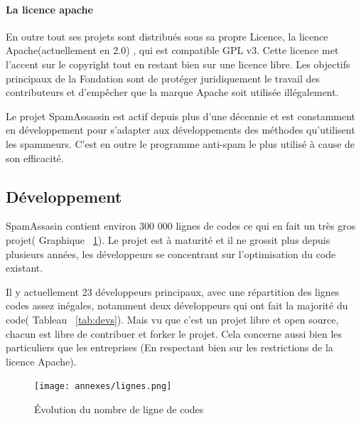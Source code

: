 \documentclass[a4paper,11pt]{article}
\begin{document}
\paragraph{La licence apache}
En outre tout ses projets sont distribués sous sa propre Licence, la licence Apache(actuellement en 2.0) , qui est compatible GPL v3.
Cette licence met l’accent sur le copyright tout en restant bien sur une licence libre. Les objectifs principaux de la Fondation sont de protéger 
juridiquement le travail des contributeurs et d'empêcher que la marque Apache soit utilisée illégalement.

Le projet SpamAssassin est actif depuis plus d'une décennie et est constamment en développement 
pour s'adapter aux développements des méthodes qu'utilisent les spammeurs. C'est en outre le programme anti-spam le plus utilisé à cause de son efficacité.

\subsection{Développement}

SpamAssasin contient environ 300 000 lignes de codes ce qui en fait un très gros projet( Graphique ~\ref{fig:code}).
Le projet est à maturité et il ne grossit plus depuis plusieurs années, les développeurs se concentrant sur l'optimisation du code existant.

Il y actuellement 23 développeurs principaux, avec une répartition des lignes codes assez inégales, notamment deux développeurs qui ont fait la majorité du code( Tableau ~\ref{tab:devs}).
Mais vu que c'est un projet libre et open source, chacun est libre de contribuer et forker le projet. Cela concerne aussi 
bien les particuliers que les entreprises (En respectant bien sur les restrictions de la licence Apache).

\begin{figure}[h]
 \texttt{[image: annexes/lignes.png]}
  \caption{Évolution du nombre de ligne de codes}
  \label {fig:code}
\end{figure}
\end{document}
